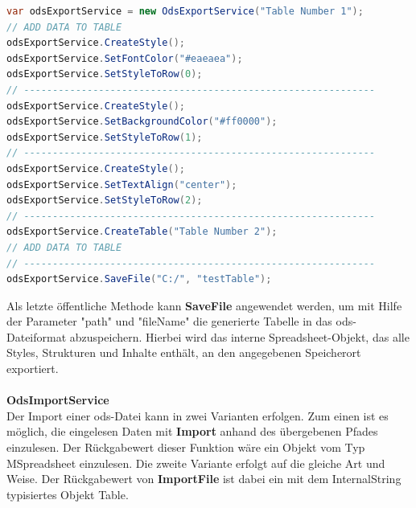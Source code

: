 \begin{lstlisting}[caption=Codebeispiel wie drei Zeilen einer Tabelle gestyled werden und eine weitere Tabelle hinzugefügt wird, language=Java]
var odsExportService = new OdsExportService("Table Number 1");
// ADD DATA TO TABLE
odsExportService.CreateStyle();
odsExportService.SetFontColor("#eaeaea");
odsExportService.SetStyleToRow(0);
// -------------------------------------------------------------
odsExportService.CreateStyle();
odsExportService.SetBackgroundColor("#ff0000");
odsExportService.SetStyleToRow(1);
// -------------------------------------------------------------
odsExportService.CreateStyle();
odsExportService.SetTextAlign("center");
odsExportService.SetStyleToRow(2);
// -------------------------------------------------------------
odsExportService.CreateTable("Table Number 2");
// ADD DATA TO TABLE
// -------------------------------------------------------------
odsExportService.SaveFile("C:/", "testTable");
\end{lstlisting}
Als letzte öffentliche Methode kann \textbf{SaveFile} angewendet werden, um mit Hilfe der Parameter "path" und "fileName" die generierte Tabelle in das ods-Dateiformat abzuspeichern. Hierbei wird das interne Spreadsheet-Objekt, das alle Styles, Strukturen und Inhalte enthält, an den angegebenen Speicherort exportiert.\\\\
\textbf{OdsImportService}\\
Der Import einer ods-Datei kann in zwei Varianten erfolgen. Zum einen ist es möglich, die eingelesen Daten mit \textbf{Import} anhand des übergebenen Pfades einzulesen. Der Rückgabewert dieser Funktion wäre ein Objekt vom Typ MSpreadsheet einzulesen. Die zweite Variante erfolgt auf die gleiche Art und Weise. Der Rückgabewert von \textbf{ImportFile} ist dabei ein mit dem InternalString typisiertes Objekt Table.

